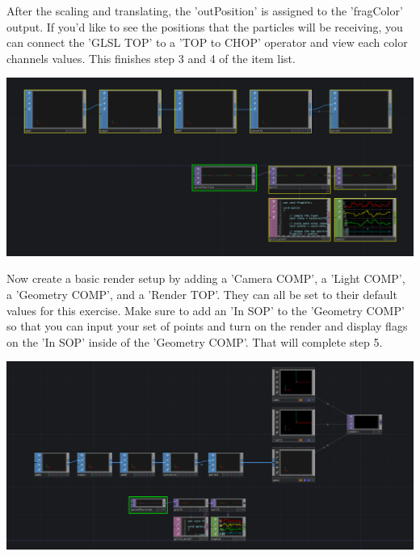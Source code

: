 \begin{fullwidth}
After the scaling and translating, the 'outPosition' is assigned to the 'fragColor' output. If you'd like to see the positions that the particles will be receiving, you can connect the 'GLSL TOP' to a 'TOP to CHOP' operator and view each color channels values. This finishes step 3 and 4 of the item list.

\begin{center}
\includegraphics{./img/12.6.2/step3_4.png}
\end{center}

Now create a basic render setup by adding a 'Camera COMP', a 'Light COMP', a 'Geometry COMP', and a 'Render TOP'. They can all be set to their default values for this exercise. Make sure to add an 'In SOP' to the 'Geometry COMP' so that you can input your set of points and turn on the render and display flags on the 'In SOP' inside of the 'Geometry COMP'. That will complete step 5.

\begin{center}
\includegraphics{./img/12.6.2/step5.png}
\end{center}


\end{fullwidth}
